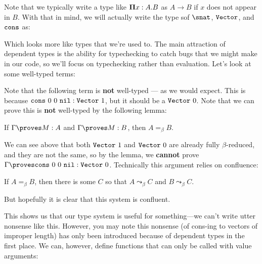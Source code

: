 \documentclass[10pt]{article}
\begin{document}
Note that we typically write a type like $\bm{\Pi} x : A . B$ as $A \to B$ if $x$ does not appear in $B$.
With that in mind, we will actually write the type sof $\snat$, $\texttt{Vector}$, and $\texttt{cons}$ as:

Which looks more like types that we're used to.
The main attraction of dependent types is the ability for typechecking to catch bugs that we might make in our code, so we'll focus on typechecking rather than evaluation.
Let's look at some well-typed terms:

Note that the following term is \textbf{not} well-typed --- as we would expect.
This is because $\texttt{cons} ~ 0 ~ 0 ~ \texttt{nil} : \texttt{Vector} ~ 1$, but it should be a $\texttt{Vector} ~ 0$.
Note that we can prove this is \textbf{not} well-typed by the following lemma:
\begin{lemma}
    If $\Gamma \proves M : A$ and $\Gamma \proves M : B$, then $A =_{\beta} B$.
\end{lemma}

We can see above that both $\texttt{Vector} ~ 1$ and $\texttt{Vector} ~ 0$ are already fully $\beta$-reduced, and they are not the same, so by the lemma, we \textbf{cannot} prove $\Gamma \proves \consT ~ 0 ~ 0 ~ \nilT : \vecT~0$.
Technically this argument relies on confluence:
\begin{lemma}[Confluence]
    If $A =_{\beta} B$, then there is some $C$ so that $A \leadsto_{\beta} C$ and $B \leadsto_{\beta} C$.
\end{lemma}
But hopefully it is clear that this system is confluent.

This shows us that our type system is useful for something---we can't write utter nonsense like this.
However, you may note this nonsense (of cons-ing to vectors of improper length) has only been introduced because of dependent types in the first place.
We can, however, define functions that can only be called with value arguments:
\newcommand{\headT}{\texttt{head}}
\eq{
    \headT &: \PiT n : \N . \vecT~(\snat~n) \to \N
}
\end{document}
